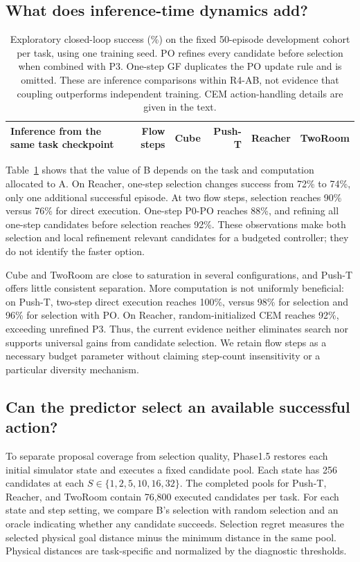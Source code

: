 \subsection{What does inference-time dynamics add?}
\begin{table}[t]
 \centering\small
 \begin{tabular}{lrrrrr}
 \toprule
 Inference from the same task checkpoint & Flow steps & Cube & Push-T & Reacher & TwoRoom \\
 \midrule
 
 \bottomrule
 \end{tabular}
 \caption{Exploratory closed-loop success (\%) on the fixed 50-episode development cohort per task, using one training seed. PO refines every candidate before selection when combined with P3. One-step GF duplicates the PO update rule and is omitted. These are inference comparisons within R4-AB, not evidence that coupling outperforms independent training. CEM action-handling details are given in the text.}
 \label{tab:reference_inference}
\end{table}

Table~\ref{tab:reference_inference} shows that the value of B depends on the task and computation allocated to A. On Reacher, one-step selection changes success from 72\% to 74\%, only one additional successful episode. At two flow steps, selection reaches 90\% versus 76\% for direct execution. One-step P0-PO reaches 88\%, and refining all one-step candidates before selection reaches 92\%. These observations make both selection and local refinement relevant candidates for a budgeted controller; they do not identify the faster option.

Cube and TwoRoom are close to saturation in several configurations, and Push-T offers little consistent separation. More computation is not uniformly beneficial: on Push-T, two-step direct execution reaches 100\%, versus 98\% for selection and 96\% for selection with PO. On Reacher, random-initialized CEM reaches 92\%, exceeding unrefined P3. Thus, the current evidence neither eliminates search nor supports universal gains from candidate selection. We retain flow steps as a necessary budget parameter without claiming step-count insensitivity or a particular diversity mechanism.

\subsection{Can the predictor select an available successful action?}
\label{app:reference_ranking}
To separate proposal coverage from selection quality, Phase1.5 restores each initial simulator state and executes a fixed candidate pool. Each state has 256 candidates at each $S\in\{1,2,5,10,16,32\}$. The completed pools for Push-T, Reacher, and TwoRoom contain 76,800 executed candidates per task. For each state and step setting, we compare B's selection with random selection and an oracle indicating whether any candidate succeeds. Selection regret measures the selected physical goal distance minus the minimum distance in the same pool. Physical distances are task-specific and normalized by the diagnostic thresholds.

